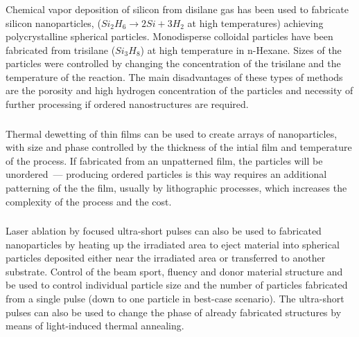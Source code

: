         \subsubsection{}
                Chemical vapor deposition of silicon from disilane gas has been used to fabricate silicon nanoparticles, ($Si_2H_6 \rightarrow 2Si + 3H_2$ at
            high temperatures) achieving polycrystalline spherical particles\cite{shi2012new}. Monodisperse colloidal particles have been fabricated from trisilane ($Si_3H_8$)
            at high temperature in n-Hexane\cite{shi2013monodisperse}. Sizes of the particles were controlled by changing the concentration of the trisilane and the temperature of the
            reaction. The main disadvantages of these types of methods are the porosity and high hydrogen concentration of the particles and necessity of
            further processing if ordered nanostructures are required.

        \subsubsection{}
                Thermal dewetting of thin films can be used to create arrays of nanoparticles, with size and phase controlled by the thickness of the intial
            film and temperature of the process\cite{abbarchi2014wafer}. If fabricated from an unpatterned film, the particles will be unordered~--- producing ordered particles is this
            way requires an additional patterning of the the film, usually by lithographic processes, which increases the complexity of the process and the cost.

        \subsubsection{}
                Laser ablation by focused ultra-short pulses can also be used to fabricated nanoparticles by heating up the irradiated area to eject material into
            spherical particles deposited either near the irradiated area\cite{kuznetsov2012magnetic} or transferred to another substrate\cite{zywietz2014laser}. Control of the beam sport, fluency and donor material
            structure and be used to control individual particle size and the number of particles fabricated from a single pulse (down to one particle in best-case
            scenario). The ultra-short pulses can also be used to change the phase of already fabricated structures by means of light-induced thermal annealing.

